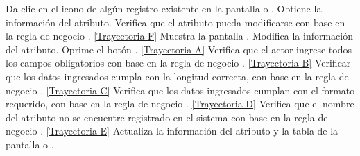 	\begin{UCtrayectoria}
		\UCpaso[\UCactor] Da clic en el icono \editar de algún registro existente en la pantalla  o .
		\UCpaso[\UCsist] Obtiene la información del atributo.
		\UCpaso[\UCsist] Verifica que el atributo pueda modificarse con base en la regla de negocio . \hyperlink{CU7-1-2:TAF}{[Trayectoria F]}
		\UCpaso[\UCsist] Muestra la pantalla .
		\UCpaso[\UCactor] Modifica la información del atributo. \label{CU7.1.2-P4}
		\UCpaso[\UCactor] Oprime el botón . \hyperlink{CU7-1-2:TAA}{[Trayectoria A]}
		\UCpaso[\UCsist] Verifica que el actor ingrese todos los campos obligatorios con base en la regla de negocio . \hyperlink{CU7-1-2:TAB}{[Trayectoria B]}
		\UCpaso[\UCsist] Verificar que los datos ingresados cumpla con la longitud correcta, con base en la regla de negocio . \hyperlink{CU7-1-2:TAC}{[Trayectoria C]}
		\UCpaso[\UCsist] Verifica que los datos ingresados cumplan con el formato requerido, con base en la regla de negocio . \hyperlink{CU7-1-2:TAD}{[Trayectoria D]}
		\UCpaso[\UCsist] Verifica que el nombre del atributo no se encuentre registrado en el sistema con base en la regla de negocio . \hyperlink{CU7-1-2:TAE}{[Trayectoria E]}
		\UCpaso[\UCsist] Actualiza la información del atributo y la tabla  de la pantalla  o .
	\end{UCtrayectoria}		
	
